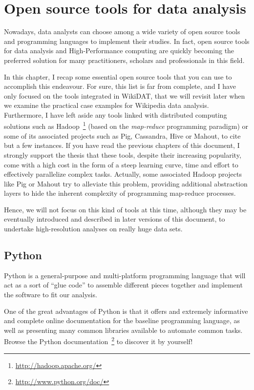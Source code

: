 
\chapter{Open source tools for data analysis}

Nowadays, data analysts can choose among a wide variety of open source tools and
programming languages to implement their studies. In fact, open source tools for
data analysis and High-Performance computing are quickly becoming the preferred
solution for many practitioners, scholars and professionals in this field.

In this chapter, I recap some essential open source tools that you can use to
accomplish this endeavour. For sure, this list is far from complete, and I have
only focused on the tools integrated in WikiDAT, that we will revisit later when
we examine the practical case examples for Wikipedia data analysis. Furthermore,
I have left aside any tools linked with distributed computing solutions such as
Hadoop~\footnote{\url{http://hadoop.apache.org/}} (based on the \textit{map-reduce}
programming paradigm) or some of its associated projects such as
Pig, Cassandra, Hive or Mahout, to cite but a few instances. If you have read
the previous chapters of this document, I strongly support the thesis that these
tools, despite their increasing popularity, come with a high cost in the form of
a steep learning curve, time and effort to effectively parallelize 
complex tasks. Actually, some associated Hadoop projects like Pig or Mahout try
to alleviate this problem, providing additional abstraction layers to hide the
inherent complexity of programming map-reduce processes.

Hence, we will not focus on this kind of tools at this time, although they may
be eventually introduced and described in later versions of this document, to
undertake high-resolution analyses on really huge data sets.

\section{Python}
Python is a general-purpose and multi-platform programming language that will act
as a sort of ``glue code'' to assemble different pieces together and 
implement the software to fit our analysis.

One of the great advantages of Python is that it offers and extremely informative 
and complete online documentation for the baseline programming language, as well 
as presenting many common libraries available to automate common tasks.
Browse the Python documentation~\footnote{\url{http://www.python.org/doc/}}
to discover it by yourself!

